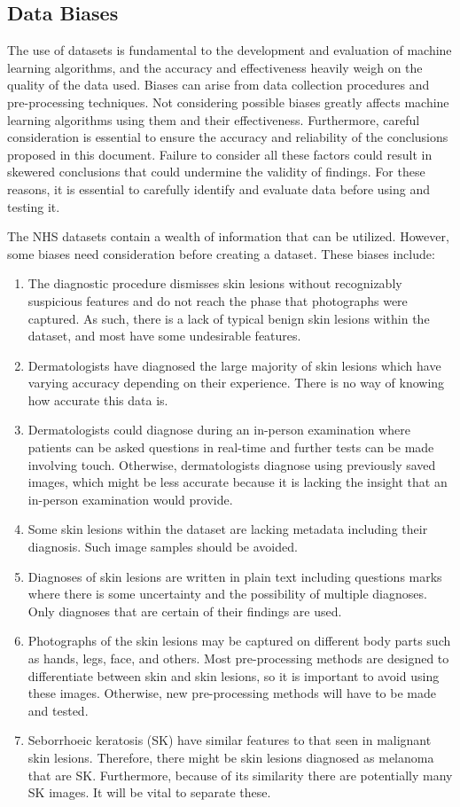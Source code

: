 \subsection{Data Biases}
The use of datasets is fundamental to the development and evaluation of machine learning algorithms, and the accuracy and effectiveness heavily weigh on the quality of the data used. Biases can arise from data collection procedures and pre-processing techniques. Not considering possible biases greatly affects machine learning algorithms using them and their effectiveness. Furthermore, careful consideration is essential to ensure the accuracy and reliability of the conclusions proposed in this document. Failure to consider all these factors could result in skewered conclusions that could undermine the validity of findings. For these reasons, it is essential to carefully identify and evaluate data before using and testing it.

The NHS datasets contain a wealth of information that can be utilized. However, some biases need consideration before creating a dataset. These biases include:
\begin{enumerate}
    \item  The diagnostic procedure dismisses skin lesions without recognizably suspicious features and do not reach the phase that photographs were captured. As such, there is a lack of typical benign skin lesions within the dataset, and most have some undesirable features.
    \item Dermatologists have diagnosed the large majority of skin lesions which have varying accuracy depending on their experience. There is no way of knowing how accurate this data is.
    \item Dermatologists could diagnose during an in-person examination where patients can be asked questions in real-time and further tests can be made involving touch. Otherwise, dermatologists diagnose using previously saved images, which might be less accurate because it is lacking the insight that an in-person examination would provide.
    \item Some skin lesions within the dataset are lacking metadata including their diagnosis. Such image samples should be avoided.
    \item Diagnoses of skin lesions are written in plain text including questions marks where there is some uncertainty and the possibility of multiple diagnoses. Only diagnoses that are certain of their findings are used.
    \item Photographs of the skin lesions may be captured on different body parts such as hands, legs, face, and others. Most pre-processing methods are designed to differentiate between skin and skin lesions, so it is important to avoid using these images. Otherwise, new pre-processing methods will have to be made and tested.
    \item Seborrhoeic keratosis (SK) have similar features to that seen in malignant skin lesions. Therefore, there might be skin lesions diagnosed as melanoma that are SK. Furthermore, because of its similarity there are potentially many SK images. It will be vital to separate these.
\end{enumerate}

